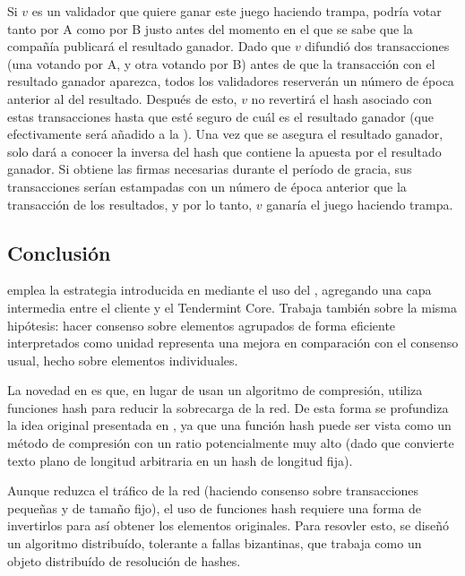 Si $v$ es un validador que quiere ganar este juego haciendo trampa, podría votar tanto por A
como por B justo antes del momento en el que se sabe que la compañía publicará el resultado ganador.
%
Dado que $v$ difundió dos transacciones (una votando por A, y otra votando por B) antes de que la
transacción con el resultado ganador aparezca, todos los validadores reserverán un número de época
anterior al del resultado. Después de esto, $v$ no revertirá el hash asociado con estas transacciones
hasta que esté seguro de cuál es el resultado ganador (que efectivamente será añadido a la \hashchain).
%
Una vez que se asegura el resultado ganador, solo dará a conocer la inversa del hash que contiene la apuesta
por el resultado ganador. Si obtiene las firmas necesarias durante el período de gracia,
sus transacciones serían estampadas con un número de época anterior que la transacción de los resultados,
y por lo tanto, $v$ ganaría el juego haciendo trampa.

\subsection{Conclusión}

\hashchain emplea la estrategia introducida en \compresschain mediante el uso del \collector,
agregando una capa
intermedia entre el cliente y el Tendermint Core.
Trabaja también sobre la misma hipótesis: hacer consenso sobre elementos agrupados de forma eficiente
interpretados como unidad representa una mejora en comparación con el consenso usual, hecho sobre elementos
individuales.

La novedad en \hashchain es que, en lugar de usan un algoritmo de compresión, utiliza funciones hash
para reducir la sobrecarga de la red.
De esta forma se profundiza la idea original presentada en \compresschain, ya que una función hash
puede ser vista como un método de compresión con un ratio potencialmente muy alto (dado que convierte
texto plano de longitud arbitraria en un hash de longitud fija).

Aunque reduzca el tráfico de la red (haciendo consenso sobre transacciones pequeñas
y de tamaño fijo), el uso de funciones hash requiere una forma de
invertirlos para así obtener los elementos originales.
Para resovler esto, se diseñó
un algoritmo distribuído, tolerante a fallas bizantinas, que trabaja como un objeto
distribuído de resolución de hashes.




